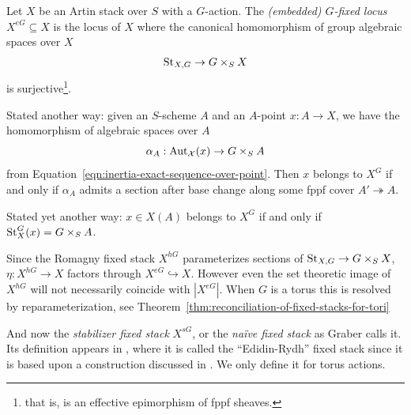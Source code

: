 \documentclass[12pt,dvipsnames]{amsart}
\begin{document}
\begin{definition}\cite{aranha-khan-latyntsev-etal_VirtualLocalizationRevisited2025}
  Let \(X\) be an Artin stack over \(S\) with a \(G\)-action. The \emph{(embedded) \(G\)-fixed locus} \(X^{eG}\subseteq X\) is the locus of \(X\) where the canonical homomorphism of group algebraic spaces over \(X\)
  \begin{align*}
    \operatorname{St}_{X,G}\to G \times_S X
  \end{align*}
  is surjective\footnote{that is, is an effective epimorphism of fppf sheaves.}.
\end{definition}
\begin{remark}
  Stated another way: given an \(S\)-scheme \(A\) and an \(A\)-point \(x:A\to X\), we have the homomorphism of algebraic spaces over \(A\)
  \[\alpha_A:\operatorname{Aut}_{\mathcal X}(x) \to G\times_SA\]
  from Equation~\ref{eqn:inertia-exact-sequence-over-point}. Then \(x\) belongs to \(X^G\) if and only if \(\alpha_A\) admits a section after base change along some fppf cover \(A' \twoheadrightarrow A\).

  \bigskip
  
  \noindent Stated yet another way: \(x\in X(A)\) belongs to \(X^G\) if and only if \(\operatorname{St}^G_X(x) = G\times_S A\).
\end{remark}

Since the Romagny fixed stack $X^{hG}$ parameterizes sections of \(\operatorname{St}_{X,G} \to G\times_SX\), \(\eta:X^{hG} \to X\) factors through \(X^{eG}\hookrightarrow X\). However even the set theoretic image of \(X^{hG}\) will not necessarily coincide with \(|X^{eG}|\). When \(G\) is a torus this is resolved by reparameterization, see Theorem~\ref{thm:reconciliation-of-fixed-stacks-for-tori}


And now the \textit{stabilizer fixed stack} \(X^{sG}\), or the \textit{na\"ive fixed stack} as Graber calls it. Its definition appears in \cite{aranha-khan-latyntsev-etal_VirtualLocalizationRevisited2025}, where it is called the ``Edidin-Rydh'' fixed stack since it is based upon a construction discussed in \cite{edidin-rydh_CanonicalReductionStabilizers2021}. We only define it for torus actions.
\end{document}
